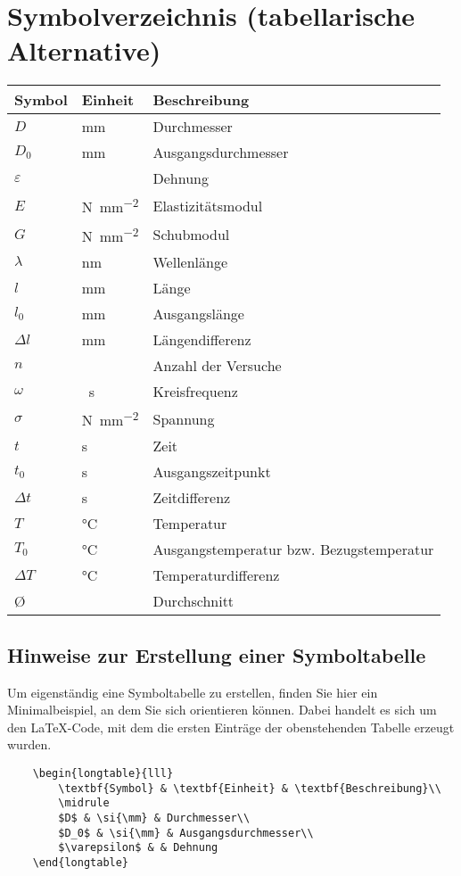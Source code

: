\chapter*{Symbolverzeichnis (tabellarische Alternative)}
\begin{spacing}{1.5}
\setlength\LTleft{15pt}
\begin{longtable}{lll}
	\textbf{Symbol} & \textbf{Einheit} & \textbf{Beschreibung}\\
	\midrule
	$D$ & \si{\mm} & Durchmesser\\
	$D_0$ & \si{\mm} & Ausgangsdurchmesser\\
	$\varepsilon$ & & Dehnung\\
	$E$ & \si{\N\per\mm\squared} & Elastizitätsmodul\\
	$G$ & \si{\N\per\mm\squared} & Schubmodul\\
	$\lambda$ & \si{\nm} & Wellenlänge\\
	$l$ & \si{\mm} & Länge\\
	$l_0$ & \si{\mm} & Ausgangslänge\\
	$\Delta l$ & \si{\mm} & Längendifferenz\\
	$n$ & & Anzahl der Versuche\\
	$\omega$ & \si{\per\s} & Kreisfrequenz\\
	$\sigma$ & \si{\N\per\mm\squared} & Spannung\\
	$t$ & \si{\s} & Zeit\\
	$t_0$ & \si{\s} & Ausgangszeitpunkt\\
	$\Delta t$ & \si{\s} & Zeitdifferenz\\
	$T$ & \si{\degreeCelsius} & Temperatur\\
	$T_0$ & \si{\degreeCelsius} & Ausgangstemperatur bzw. Bezugstemperatur\\
	$\Delta T$ & \si{\degreeCelsius} & Temperaturdifferenz\\
	\O & & Durchschnitt
\end{longtable}
\end{spacing}

\newpage
\section{Hinweise zur Erstellung einer Symboltabelle}
Um eigenständig eine Symboltabelle zu erstellen, finden Sie hier ein Minimalbeispiel, an dem Sie sich orientieren können. Dabei handelt es sich um den \LaTeX-Code, mit dem die ersten Einträge der obenstehenden Tabelle erzeugt wurden.

\lstset{language=TeX,tabsize=4}
\begin{lstlisting}
	\begin{longtable}{lll}
		\textbf{Symbol} & \textbf{Einheit} & \textbf{Beschreibung}\\
		\midrule
		$D$ & \si{\mm} & Durchmesser\\
		$D_0$ & \si{\mm} & Ausgangsdurchmesser\\
		$\varepsilon$ & & Dehnung
	\end{longtable}
\end{lstlisting}